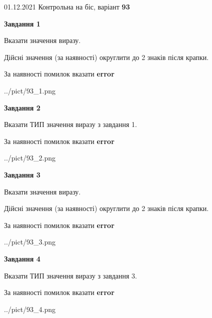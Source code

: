 \documentclass[11pt, ukrainian]{article}
\begin{document}
{01.12.2021 Контрольна на біс, варіант  \No \textbf { 93 }\par}
{
\begin {large}
{\begin {center}\textbf{Завдання 1}\end {center}}\par
Вказати значення виразу. \par
Дійсні значення (за наявності) округлити до 2 знаків після крапки. \par
За наявності помилок вказати \textbf{error}

\begin{center}
	{../pict/93_1.png}
\end{center}
\newpage

{\begin {center}\textbf{Завдання 2}\end {center}}\par
Вказати ТИП значення виразу з завдання 1. \par
За наявності помилок вказати \textbf{error}

\begin{center}
	{../pict/93_2.png}
\end{center}
\newpage

{\begin {center}\textbf{Завдання 3}\end {center}}\par
Вказати значення виразу. \par
Дійсні значення (за наявності) округлити до 2 знаків після крапки. \par
За наявності помилок вказати \textbf{error}

\begin{center}
	{../pict/93_3.png}
\end{center}
\newpage

{\begin {center}\textbf{Завдання 4}\end {center}}\par
Вказати ТИП значення виразу з завдання 3. \par
За наявності помилок вказати \textbf{error}

\begin{center}
	{../pict/93_4.png}
\end{center}
\newpage


\end{large}}
\end{document}
